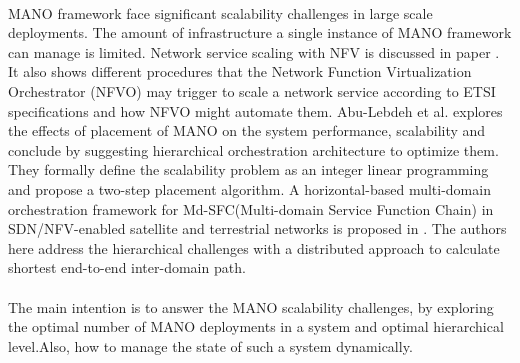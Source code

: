 \paragraph{}
MANO framework face significant scalability challenges in large scale deployments. The amount of infrastructure a single instance of MANO framework can manage is limited. Network service scaling with NFV is discussed in paper \cite{adamuz2018automated}. It also shows different procedures that the Network Function Virtualization Orchestrator (NFVO) may trigger to scale a network service according to ETSI specifications and how NFVO might automate them. Abu-Lebdeh et al. \cite{abu-lebdeh_nfv_2017} explores the effects of placement of MANO on the system performance, scalability and conclude by suggesting hierarchical orchestration architecture to optimize them. They formally define the scalability problem as an integer linear programming and propose a two-step placement algorithm. 
A horizontal-based multi-domain orchestration framework for  Md-SFC(Multi-domain Service Function Chain) in SDN/NFV-enabled satellite and terrestrial networks is proposed in \cite{li_horizontal-based_2018}. The authors here address the hierarchical challenges with a distributed approach to calculate shortest end-to-end inter-domain path.  
\paragraph{}
The main intention is to answer the MANO scalability challenges, by exploring the optimal number of MANO deployments in a system and optimal hierarchical level.Also, how to manage the state of such a system dynamically.
